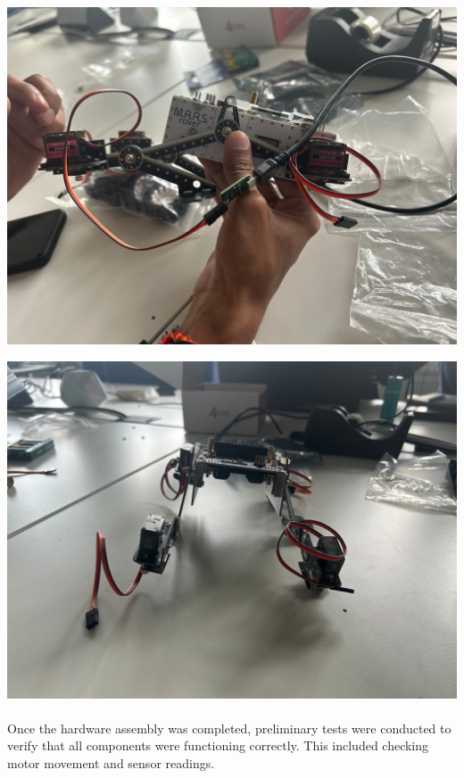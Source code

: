 \begin{minipage}{0.46\textwidth}
    \vspace{0.4cm}
    \centering
    \includegraphics[width=\textwidth]{Hauptkapitel/Pictures/As2.jpg}
    \label{fig:Assembl2}
\end{minipage}
\hfill
\begin{minipage}{0.46\textwidth}
    \vspace{0.4cm}
    \centering
    \includegraphics[width=\textwidth]{Hauptkapitel/Pictures/As3.jpg}
    \label{fig:Assembl3}
\end{minipage}

\paragraph{}Once the hardware assembly was completed, preliminary tests were conducted to verify that all components were functioning correctly. This included checking motor movement and sensor readings.


